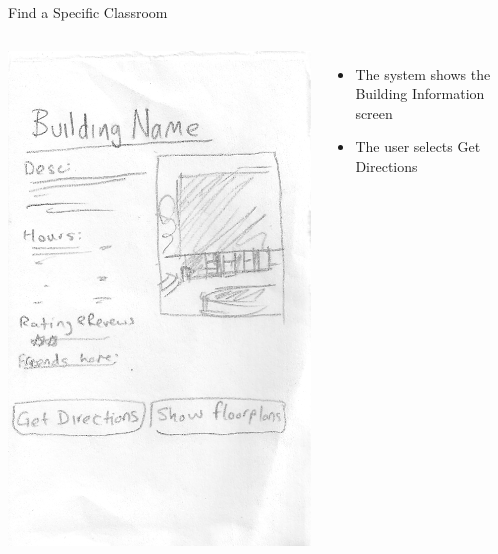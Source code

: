 \documentclass{beamer}
\begin{document}
\begin{frame}{Find a Specific Classroom}
    \begin{columns}[c]
        \center\includegraphics[height=0.75 \textheight]{hand-drawn/buildinginfo.png}
        \begin{itemize}
            \item The system shows the Building Information screen
            \item The user selects Get Directions
        \end{itemize}
    \end{columns}
\end{frame}
\end{document}
